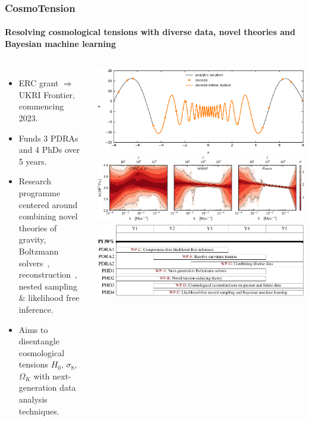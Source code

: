 \documentclass[aspectratio=169]{beamer}
\begin{document}
\begin{frame}
    \frametitle{CosmoTension}
    \framesubtitle{Resolving cosmological tensions with diverse data, novel theories and Bayesian machine learning}
    \begin{columns}
        \begin{itemize}
            \item ERC grant $\Rightarrow$ UKRI Frontier, commencing 2023.
            \item Funds 3 PDRAs and 4 PhDs over 5 years.
            \item Research programme centered around combining novel theories of gravity, Boltzmann solvers~, reconstruction~, nested sampling \& likelihood free inference.
            \item Aims to disentangle cosmological tensions $H_0$, $\sigma_8$, $\Omega_K$ with next-generation data analysis techniques.
        \end{itemize}
        \includegraphics[width=\textwidth]{figures/denseoutput.pdf}
        \includegraphics[width=\textwidth]{figures/pps.pdf}
        \includegraphics[width=\textwidth]{figures/gantt.pdf}
    \end{columns}
\end{frame}
\end{document}
